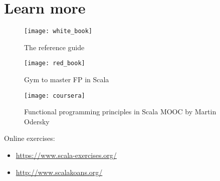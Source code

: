 \documentclass[10pt]{beamer}
\begin{document}
\section{Learn more}

\begin{frame}
\begin{figure}
\centering
\texttt{[image: white\_book]}
\caption{The reference guide}
\end{figure}
\end{frame}

\begin{frame}
\begin{figure}
\centering
\texttt{[image: red\_book]}
\caption{Gym to master FP in Scala}
\end{figure}
\end{frame}

\begin{frame}
\begin{figure}
\centering
\texttt{[image: coursera]}
\caption{Functional programming principles in Scala MOOC by Martin Odersky}
\end{figure}
\end{frame}

\begin{frame}
Online exercises:
\begin{itemize}
\item \url{https://www.scala-exercises.org/}
\item \url{http://www.scalakoans.org/}
\end{itemize}
\end{frame}


% 
% 
\end{document}
